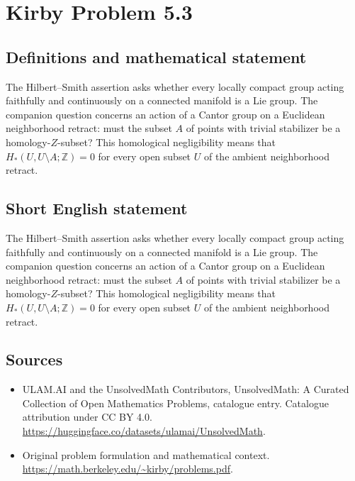 \documentclass[11pt]{article}
\begin{document}
\section{Kirby Problem 5.3}\label{statement}

\subsection{Definitions and mathematical statement}
The Hilbert--Smith assertion asks whether every locally compact group acting faithfully and continuously on a connected manifold is a Lie group. The companion question concerns an action of a Cantor group on a Euclidean neighborhood retract: must the subset $A$ of points with trivial stabilizer be a homology-$Z$-subset? This homological negligibility means that $H_*(U,U\setminus A;\mathbb Z)=0$ for every open subset $U$ of the ambient neighborhood retract.
\subsection{Short English statement}
The Hilbert--Smith assertion asks whether every locally compact group acting faithfully and continuously on a connected manifold is a Lie group. The companion question concerns an action of a Cantor group on a Euclidean neighborhood retract: must the subset $A$ of points with trivial stabilizer be a homology-$Z$-subset? This homological negligibility means that $H_*(U,U\setminus A;\mathbb Z)=0$ for every open subset $U$ of the ambient neighborhood retract.
\subsection{Sources}
\begin{itemize}
\item[\hypertarget{source:statement:1}{S1}] ULAM.AI and the UnsolvedMath Contributors, UnsolvedMath: A Curated Collection of Open Mathematics Problems, catalogue entry. Catalogue attribution under CC BY 4.0.
\url{https://huggingface.co/datasets/ulamai/UnsolvedMath}.
\item[\hypertarget{source:statement:2}{S2}] Original problem formulation and mathematical context.
\url{https://math.berkeley.edu/~kirby/problems.pdf}.
\end{itemize}
\label{end:statement}
\end{document}

